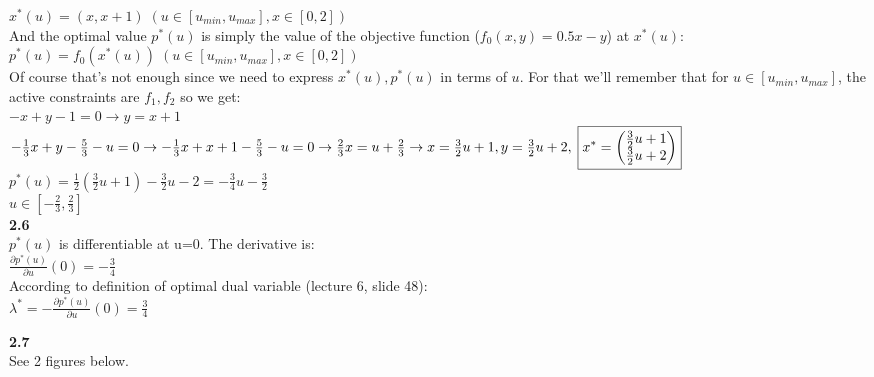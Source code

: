 \documentclass[fleqn]{article}
\begin{document}
$x^*(u) = (x,x+1) \; (u \in [u_{min}, u_{max}], x \in [0,2])$\\

And the optimal value $p^*(u)$ is simply the value of the objective function ($f_0(x,y) = 0.5x-y$) at $x^*(u)$: \\

$p^*(u) = f_0(x^*(u)) \; (u \in [u_{min}, u_{max}], x \in [0,2])$\\

Of course that's not enough since we need to express $x^*(u), p^*(u)$ in terms of $u$. For that we'll remember that for $u \in [u_{min}, u_{max}]$, the active constraints are $f_1, f_2$ so we get:\\

$-x + y - 1 = 0 \rightarrow y=x+1$\\
$-\frac{1}{3}x + y - \frac{5}{3} - u = 0 \rightarrow
-\frac{1}{3}x + x + 1 - \frac{5}{3} - u = 0 \rightarrow
\frac{2}{3}x = u+\frac{2}{3} \rightarrow \\
x = \frac{3}{2}u+1, y = \frac{3}{2}u+2, \; 
\boxed{x^* = \begin{pmatrix}
           \frac{3}{2}u+1 \\
           \frac{3}{2}u+2 
         \end{pmatrix}}$\\
        

$\boxed{p^*(u) = \frac{1}{2} \left( \frac{3}{2}u+1 \right) - \frac{3}{2}u-2 = 
-\frac{3}{4}u-\frac{3}{2}}$\\

$u \in [-\frac{2}{3}, \frac{2}{3}]$ \\


\textbf{2.6} \\
$p^*(u)$ is differentiable at u=0. The derivative is:\\
$\frac{\partial p^*(u)}{\partial u} (0) = -\frac{3}{4}$\\
According to definition of optimal dual variable (lecture 6, slide 48): \\
$\lambda ^* = -\frac{\partial p^*(u)}{\partial u}(0) = \frac{3}{4}$


\textbf{2.7} \\
See 2 figures below. \\
\end{document}
